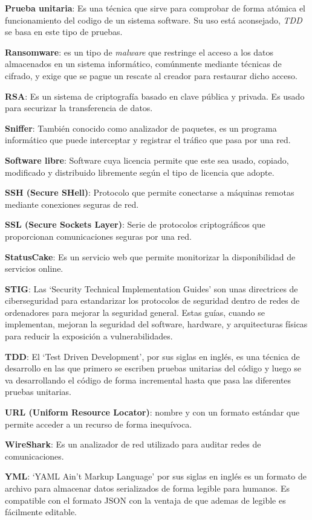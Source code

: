 \textbf{Prueba unitaria}: Es una técnica que sirve para comprobar de forma atómica el funcionamiento del codigo de un sistema software. Su uso está aconsejado, \textit{TDD} se basa en este tipo de pruebas.
\bigskip

\textbf{Ransomware}: es un tipo de \textit{malware} que restringe el acceso a los datos almacenados en un sistema informático, comúnmente mediante técnicas de cifrado, y exige que se pague un rescate al creador para restaurar dicho acceso.
\bigskip

\textbf{RSA}: Es un sistema de criptografía basado en clave pública y privada. Es usado para securizar la transferencia de datos.
\bigskip

\textbf{Sniffer}: También conocido como analizador de paquetes, es un programa informático que puede interceptar y registrar el tráfico que pasa por una red.
\bigskip

\textbf{Software libre}: Software cuya licencia permite que este sea usado, copiado, modificado y distribuido libremente según el tipo de licencia que adopte.
\bigskip

\textbf{SSH (Secure SHell)}: Protocolo que permite conectarse a máquinas remotas mediante conexiones seguras de red.
\bigskip

\textbf{SSL (Secure Sockets Layer)}: Serie de protocolos criptográficos que proporcionan comunicaciones seguras por una red.
\bigskip

\textbf{StatusCake}: Es un servicio web que permite monitorizar la disponibilidad de servicios online.
\bigskip

\textbf{STIG}: Las `Security Technical Implementation Guides' son unas directrices de ciberseguridad para estandarizar los protocolos de seguridad dentro de redes de ordenadores para mejorar la seguridad general. Estas guías, cuando se implementan, mejoran la seguridad del software, hardware, y arquitecturas físicas para reducir la exposición a vulnerabilidades.
\bigskip

\textbf{TDD}: El `Test Driven Development', por sus siglas en inglés, es una técnica de desarrollo en las que primero se escriben pruebas unitarias del código y luego se va desarrollando el código de forma incremental hasta que pasa las diferentes pruebas unitarias.
\bigskip

\textbf{URL (Uniform Resource Locator)}: nombre y con un formato estándar que permite acceder a un recurso de forma inequívoca.
\bigskip

\textbf{WireShark}: Es un analizador de red utilizado para auditar redes de comunicaciones.
\bigskip

\textbf{YML}: `YAML Ain't Markup Language' por sus siglas en inglés es un formato de archivo para almacenar datos serializados de forma legible para humanos. Es compatible con el formato JSON con la ventaja de que ademas de legible es fácilmente editable.
